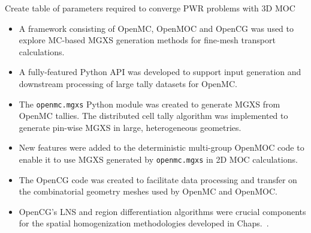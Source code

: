 Create table of parameters required to converge PWR problems with 3D MOC

\clearpage

\vfill
\begin{highlightsbox}[frametitle=Highlights]
\begin{itemize}
  \item A framework consisting of OpenMC, OpenMOC and OpenCG was used to explore \ac{MC}-based \ac{MGXS} generation methods for fine-mesh transport calculations.
  \item A fully-featured Python \ac{API} was developed to support input generation and downstream processing of large tally datasets for OpenMC.
  \item The \texttt{openmc.mgxs} Python module was created to generate \ac{MGXS} from OpenMC tallies. The distributed cell tally algorithm was implemented to generate pin-wise \ac{MGXS} in large, heterogeneous geometries.
  \item New features were added to the deterministic multi-group OpenMOC code to enable it to use \ac{MGXS} generated by \texttt{openmc.mgxs} in 2D \ac{MOC} calculations.
  \item The OpenCG code was created to facilitate data processing and transfer on the combinatorial geometry meshes used by OpenMC and OpenMOC.
  \item OpenCG's \ac{LNS} and region differentiation algorithms were crucial components for the spatial homogenization methodologies developed in Chaps.~.  
\end{itemize}
\end{highlightsbox}
\vfill